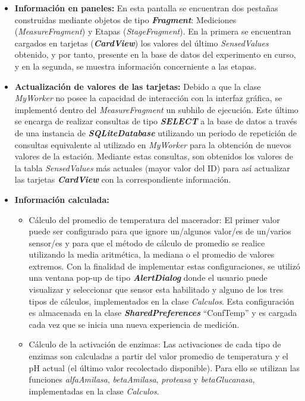 \begin{itemize}
                \item\textbf{ Información en paneles:} En esta pantalla se encuentran dos pestañas construidas mediante objetos de tipo \textbf{\textit{\gls{Fragment}}}: Mediciones (\textit{MeasureFragment}) y Etapas (\textit{StageFragment}). En la primera se encuentran cargados en tarjetas (\textbf{\textit{\gls{CardView}}}) los valores del último \textit{SensedValues} obtenido, y por tanto, presente en la base de datos del experimento en curso, y en la segunda, se muestra información concerniente a las etapas.
                
                \item \textbf{Actualización de valores de las tarjetas:} Debido a que la clase \textit{MyWorker} no posee la capacidad de interacción con la interfaz gráfica, se implementó dentro del \textit{MeasureFragment} un subhilo de ejecución. Este último se encarga de realizar consultas de tipo \textbf{\textit{\gls{SELECT}}} a la base de datos a través de una instancia de \textbf{\textit{\gls{SQLiteDatabase}}} utilizando un periodo de repetición de consultas equivalente al utilizado en \textit{MyWorker} para la obtención de nuevos valores de la estación. Mediante estas consultas, son obtenidos los valores de la tabla \textit{SensedValues} más actuales (mayor valor del ID) para así actualizar las tarjetas \textbf{\textit{\gls{CardView}}} con la correspondiente información.
                
                \item \textbf{Información calculada:}
                \begin{itemize}
                    \item Cálculo del promedio de temperatura del macerador: El primer valor puede ser configurado para que ignore un/algunos valor/es de un/varios sensor/es y para que el método de cálculo de promedio se realice utilizando la media aritmética, la mediana o el promedio de valores extremos. Con la finalidad de implementar estas configuraciones, se utilizó una ventana pop-up de tipo \textbf{\textit{\gls{AlertDialog}}} donde el usuario puede visualizar y seleccionar que sensor esta habilitado y alguno de los tres tipos de cálculos, implementados en la clase \textit{Calculos}. Esta configuración es almacenada en la clase \textbf{\textit{SharedPreferences}} ``ConfTemp'' y es cargada cada vez que se inicia una nueva experiencia de medición. 
                
                    \item Cálculo de la activación de enzimas: Las activaciones de cada tipo de enzimas son calculadas a partir del valor promedio de temperatura y el pH actual (el último valor recolectado disponible). Para ello se utilizan las funciones \textit{alfaAmilasa}, \textit{betaAmilasa}, \textit{proteasa} y \textit{betaGlucanasa}, implementadas en la clase \textit{Calculos}. 
                

\end{itemize}
\end{itemize}
